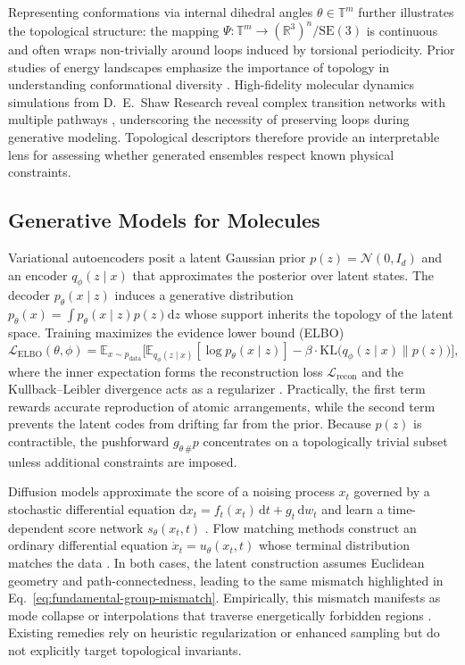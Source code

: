 \documentclass[11pt]{article}
\theoremstyle{definition}
\begin{document}
Representing conformations via internal dihedral angles $\theta \in \mathbb{T}^m$ further illustrates the topological structure: the mapping $\Psi : \mathbb{T}^m \to (\mathbb{R}^3)^n / \mathrm{SE}(3)$ is continuous and often wraps non-trivially around loops induced by torsional periodicity. Prior studies of energy landscapes emphasize the importance of topology in understanding conformational diversity \cite{wales2001microscopic}. High-fidelity molecular dynamics simulations from D.~E.~Shaw Research reveal complex transition networks with multiple pathways \cite{shaw2010atomic}, underscoring the necessity of preserving loops during generative modeling. Topological descriptors therefore provide an interpretable lens for assessing whether generated ensembles respect known physical constraints.

\subsection{Generative Models for Molecules}
Variational autoencoders posit a latent Gaussian prior $p(z) = \mathcal{N}(0, I_d)$ and an encoder $q_\phi(z \mid x)$ that approximates the posterior over latent states. The decoder $p_\theta(x \mid z)$ induces a generative distribution $p_\theta(x) = \int p_\theta(x \mid z) p(z) \mathrm{d}z$ whose support inherits the topology of the latent space. Training maximizes the evidence lower bound (ELBO)
\begin{equation}
    \mathcal{L}_{\text{ELBO}}(\theta, \phi) = \mathbb{E}_{x \sim p_{\text{data}}} \big[ \mathbb{E}_{q_\phi(z \mid x)} [\log p_\theta(x \mid z)] - \beta \cdot \mathrm{KL}\big(q_\phi(z \mid x) \big\| p(z)\big) \big],
    \label{eq:elbo}
\end{equation}
where the inner expectation forms the reconstruction loss $\mathcal{L}_{\text{recon}}$ and the Kullback--Leibler divergence acts as a regularizer \cite{kingma2014auto}. Practically, the first term rewards accurate reproduction of atomic arrangements, while the second term prevents the latent codes from drifting far from the prior. Because $p(z)$ is contractible, the pushforward $g_{\theta\,\#}p$ concentrates on a topologically trivial subset unless additional constraints are imposed.

Diffusion models approximate the score of a noising process $x_t$ governed by a stochastic differential equation $\mathrm{d}x_t = f_t(x_t) \, \mathrm{d}t + g_t \, \mathrm{d}w_t$ and learn a time-dependent score network $s_\theta(x_t, t)$ \cite{song2021score}. Flow matching methods construct an ordinary differential equation $\dot{x}_t = u_\theta(x_t, t)$ whose terminal distribution matches the data \cite{lipman2023flow}. In both cases, the latent construction assumes Euclidean geometry and path-connectedness, leading to the same mismatch highlighted in Eq.~\eqref{eq:fundamental-group-mismatch}. Empirically, this mismatch manifests as mode collapse or interpolations that traverse energetically forbidden regions \cite{noe2019boltzmann, trippe2023diffusion}. Existing remedies rely on heuristic regularization or enhanced sampling but do not explicitly target topological invariants.
\end{document}
